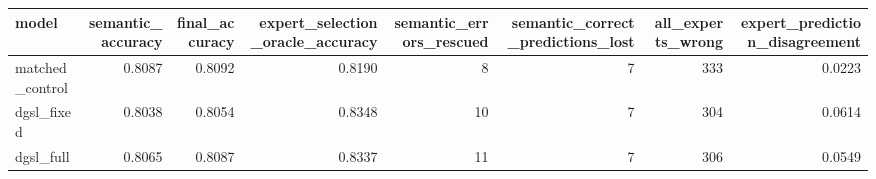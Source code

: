 \begin{tabular}{lrrrrrrr}
\toprule
model & semantic\_accuracy & final\_accuracy & expert\_selection\_oracle\_accuracy & semantic\_errors\_rescued & semantic\_correct\_predictions\_lost & all\_experts\_wrong & expert\_prediction\_disagreement \\
\midrule
matched\_control & 0.8087 & 0.8092 & 0.8190 & 8 & 7 & 333 & 0.0223 \\
dgsl\_fixed & 0.8038 & 0.8054 & 0.8348 & 10 & 7 & 304 & 0.0614 \\
dgsl\_full & 0.8065 & 0.8087 & 0.8337 & 11 & 7 & 306 & 0.0549 \\
\bottomrule
\end{tabular}
